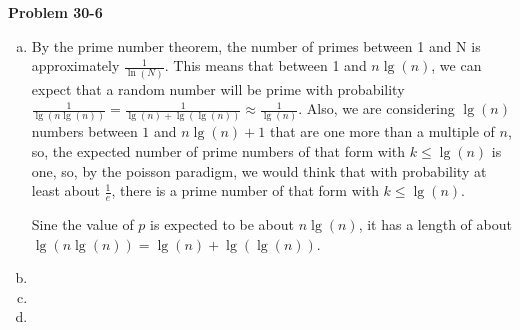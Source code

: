 \documentclass{article}
\begin{document}
\noindent\textbf{Problem 30-6}\\
\begin{enumerate}[a.]
\item
By the prime number theorem, the number of primes between 1 and N is approximately $\frac{1}{\ln(N)}$. This means that between 1 and $n\lg(n)$, we can expect that a random number will be prime with probability $\frac{1}{\lg(n\lg(n))} = \frac{1}{\lg(n) + \lg(\lg(n))} \approx \frac{1}{\lg(n)}$. Also, we are considering $\lg(n)$ numbers between $1$ and $n\lg(n)+1$ that are one more than a multiple of $n$, so, the expected number of prime numbers of that form with $k \le \lg(n)$ is one, so, by the poisson paradigm, we would think that with probability at least about $\frac{1}{e}$, there is a prime number of that form with $k\le\lg(n)$.

Sine the value of $p$ is expected to be about $n\lg(n)$, it has a length of about $\lg(n\lg(n))  = \lg(n) + \lg(\lg(n))$.
\item


\item

\item
\end{enumerate}
\end{document}
